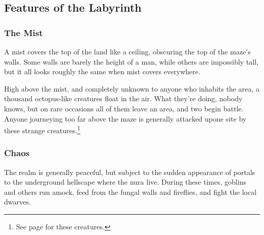 \begin{multicols}{2}
\subsection{Features of the Labyrinth}

\subsubsection{The Mist}

A mist covers the top of the land like a ceiling, obscuring the top of the maze's walls.  Some walls are barely the height of a man, while others are impossibly tall, but it all looks roughly the same when mist covers everywhere.

High above the mist, and completely unknown to anyone who inhabits the area, a thousand octopus-like creatures float in the air.  What they're doing, nobody knows, but on rare occasions all of them leave an area, and two begin battle.  Anyone journeying too far above the maze is generally attacked upone site by these strange creatures.\footnote{See page \pageref{archmage} for these creatures.}

\subsubsection{Chaos}
The realm is generally peaceful, but subject to the sudden appearance of portals to the underground hellscape where the nura live.  During these times, goblins and others run amock, feed from the fungal walls and fireflies, and fight the local dwarves.

\end{multicols}

